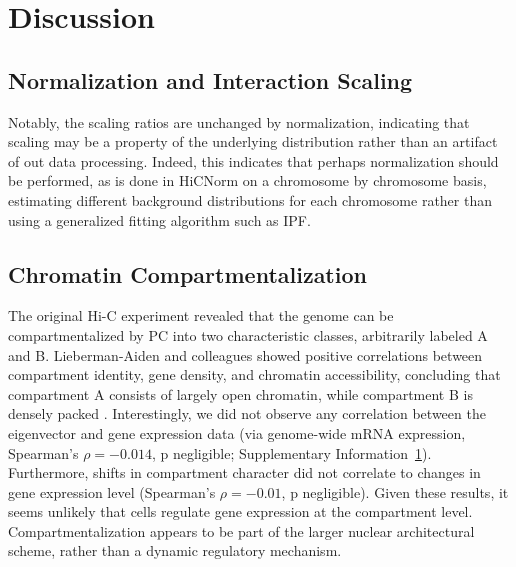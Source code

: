 \chapter{Discussion}

\section*{Normalization and Interaction Scaling}
Notably, the scaling ratios are unchanged by normalization, indicating that scaling may be a property of the underlying distribution
rather than an artifact of out data processing.  Indeed, this indicates that perhaps normalization should be performed, as is
done in HiCNorm \citep{hu2012} on a chromosome by chromosome basis, estimating different background distributions for each chromosome
rather than using a generalized fitting algorithm such as IPF\@.

\section*{Chromatin Compartmentalization}

The original Hi-C experiment revealed that the genome can be compartmentalized by \gls{PC} into two characteristic classes, arbitrarily
labeled A and B.  Lieberman-Aiden and colleagues showed positive correlations between compartment identity, gene density, and chromatin
accessibility, concluding that compartment A consists of largely open chromatin, while compartment B is densely packed \citep{aiden2009}.
Interestingly, we did not observe any correlation between the eigenvector and gene expression data (via genome-wide mRNA expression,
Spearman's $\rho = -0.014$, p negligible; Supplementary Information~\ref{}).  Furthermore, shifts in compartment character did not correlate to
changes in gene expression level (Spearman's $\rho = -0.01$, p negligible).  Given these results, it seems unlikely that cells regulate
gene expression at the compartment level.  Compartmentalization appears to be part of the larger nuclear architectural scheme, rather than
a dynamic regulatory mechanism.
